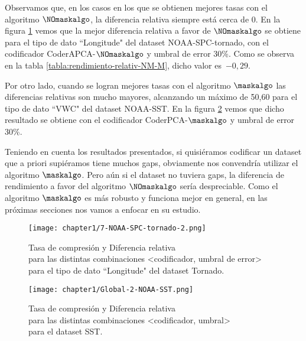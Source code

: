 Observamos que, en los casos en los que se obtienen mejores tasas con el algoritmo $\NOmaskalgo$, la diferencia relativa siempre está cerca de 0. En la figura \ref{fig:diff-tornado} vemos que la mejor diferencia relativa a favor de $\NOmaskalgo$ se obtiene para el tipo de dato ``Longitude" del dataset NOAA-SPC-tornado, con el codificador CoderAPCA-$\NOmaskalgo$ y umbral de error 30\%. Como se observa en la tabla \ref{tabla:rendimiento-relativ-NM-M}, dicho valor es~$-0,29$.

Por otro lado, cuando se logran mejores tasas con el algoritmo $\maskalgo$ las diferencias relativas son mucho mayores, alcanzando un máximo de 50,60 para el tipo de dato ``VWC" del dataset NOAA-SST. En la figura \ref{fig:diff-sst} vemos que dicho resultado se obtiene con el codificador CoderPCA-$\maskalgo$ y umbral de error 30\%.

Teniendo en cuenta los resultados presentados, si quisiéramos codificar un dataset que a priori supiéramos tiene muchos gaps, obviamente nos convendría utilizar el algoritmo $\maskalgo$. Pero aún si el dataset no tuviera gaps, la diferencia de rendimiento a favor del algoritmo $\NOmaskalgo$ sería despreciable. Como el algoritmo $\maskalgo$ es más robusto y funciona mejor en general, en las próximas secciones nos vamos a enfocar en su estudio.

\begin{figure}
\hspace{-35pt}
\texttt{[image: chapter1/7-NOAA-SPC-tornado-2.png]}
\hspace{+10pt}
\caption{Tasa de compresión y Diferencia relativa\\para las distintas combinaciones <codificador, umbral de error>\\para el tipo de dato ``Longitude" del dataset Tornado.}
\label{fig:diff-tornado}
\end{figure}

\begin{figure}
\hspace{-35pt}
\texttt{[image: chapter1/Global-2-NOAA-SST.png]}
\hspace{+10pt}
\caption{Tasa de compresión y Diferencia relativa\\para las distintas combinaciones <codificador, umbral>\\para el dataset SST.}
\label{fig:diff-sst}
\end{figure}


